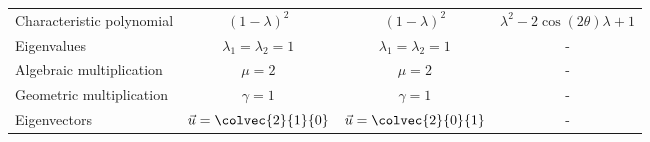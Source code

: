 {\begin{tabular}{lccc}
  Characteristic polynomial & $\left( 1-\lambda \right)^{2}$ & $\left( 1-\lambda \right)^{2}$ & $\lambda^{2}-2\cos(2\theta)\lambda + 1$ \\
  Eigenvalues & $\lambda_{1}=\lambda_{2}=1$ & $\lambda_{1}=\lambda_{2}=1$ & - \\
  Algebraic multiplication & $\mu=2$ & $\mu=2$ & - \\
  Geometric multiplication & $\gamma=1$ & $\gamma=1$ & - \\
  Eigenvectors & $\vec{u}=\colvec{2}{1}{0}$ & $\vec{u}=\colvec{2}{0}{1}$ & - \\
  \midrule
\end{tabular}
}\flushleft
